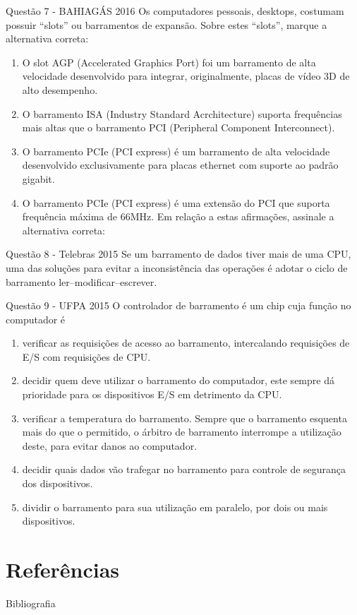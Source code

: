 \documentclass[aspectratio=169,
				xcolor=table]{beamer}
\begin{document}
	\begin{frame}{Questão 7 - BAHIAGÁS 2016}
		Os computadores pessoais, desktops, costumam possuir “slots” ou barramentos de expansão. Sobre estes “slots”, marque a alternativa correta:
		\begin{enumerate}[I]
			\item O slot AGP (Accelerated Graphics Port) foi um barramento de alta velocidade desenvolvido para integrar, originalmente, placas de vídeo 3D de alto desempenho.
			\item O barramento ISA (Industry Standard Acrchitecture) suporta frequências mais altas que o barramento PCI (Peripheral Component Interconnect).
			\item O barramento PCIe (PCI express) é um barramento de alta velocidade desenvolvido exclusivamente para placas ethernet com suporte ao padrão gigabit.
			\item O barramento PCIe (PCI express) é uma extensão do PCI que suporta frequência máxima de 66MHz.
Em relação a estas afirmações, assinale a alternativa correta: 
		
		\end{enumerate}

	\end{frame}
	
	\begin{frame}{Questão 8 - Telebras 2015}
		Se um barramento de dados tiver mais de uma CPU, uma das soluções para evitar a inconsistência das operações é adotar o ciclo de barramento ler–modificar–escrever.

	\end{frame}
	
	\begin{frame}{Questão 9 - UFPA 2015}
		O controlador de barramento é um chip cuja função no computador é
		\begin{enumerate}[a]
			\item verificar as requisições de acesso ao barramento, intercalando requisições de E/S com requisições de CPU.
  
			\item decidir quem deve utilizar o barramento do computador, este sempre dá prioridade para os dispositivos E/S em detrimento da CPU.
  
			\item verificar a temperatura do barramento. Sempre que o barramento esquenta mais do que o permitido, o árbitro de barramento interrompe a utilização deste, para evitar danos ao computador.
  
  			\item decidir quais dados vão trafegar no barramento para controle de segurança dos dispositivos.
  
  			\item dividir o barramento para sua utilização em paralelo, por dois ou mais dispositivos.
		
		\end{enumerate}
	\end{frame}

	\section{Referências}
	\begin{frame}{Bibliografia}
		\nocite{Delgado2017}
		\nocite{Stallings2010}
    	
    	   	
	
	\end{frame}
\end{document}
